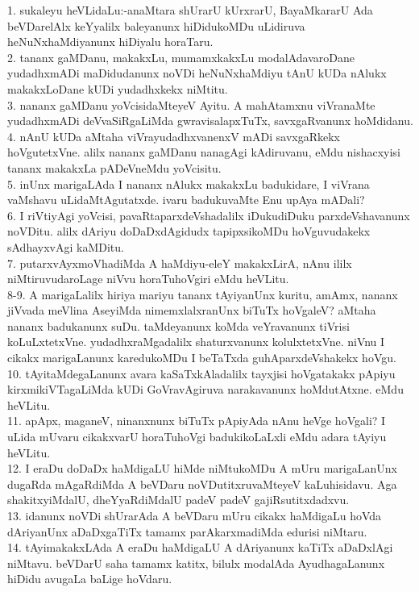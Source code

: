 \documentclass{article}
\begin{document}
1. sukaleyu heVLidaLu:-anaMtara shUrarU kUrxrarU, BayaMkararU Ada beVDarelAlx keYyalilx baleyanunx hiDidukoMDu uLidiruva heNuNxhaMdiyanunx hiDiyalu horaTaru.\\
2. tananx gaMDanu, makakxLu, mumamxkakxLu modalAdavaroDane yudadhxmADi maDidudanunx noVDi heNuNxhaMdiyu tAnU kUDa nAlukx makakxLoDane kUDi yudadhxkekx niMtitu.\\
3. nananx gaMDanu yoVcisidaMteyeV Ayitu. A mahAtamxnu viVranaMte yudadhxmADi deVvaSiRgaLiMda gwravisalapxTuTx, savxgaRvanunx hoMdidanu.\\
4. nAnU kUDa aMtaha viVrayudadhxvanenxV mADi savxgaRkekx hoVgutetxVne. alilx nananx gaMDanu nanagAgi kAdiruvanu, eMdu nishacxyisi tananx makakxLa pADeVneMdu yoVcisitu.\\
5. inUnx marigaLAda I nananx nAlukx makakxLu badukidare, I viVrana vaMshavu uLidaMtAgutatxde. ivaru badukuvaMte Enu upAya mADali?\\
6. I riVtiyAgi yoVcisi, pavaRtaparxdeVshadalilx iDukudiDuku parxdeVshavanunx noVDitu. alilx dAriyu doDaDxdAgidudx tapipxsikoMDu hoVguvudakekx sAdhayxvAgi kaMDitu.\\
7. putarxvAyxmoVhadiMda A haMdiyu-eleY makakxLirA, nAnu ililx niMtiruvudaroLage niVvu horaTuhoVgiri eMdu heVLitu.\\
8-9. A marigaLalilx hiriya mariyu tananx tAyiyanUnx kuritu, amAmx, nananx jiVvada meVlina AseyiMda nimemxlalxranUnx biTuTx hoVgaleV? aMtaha nananx badukanunx suDu. taMdeyanunx koMda veYravanunx tiVrisi koLuLxtetxVne. yudadhxraMgadalilx shaturxvanunx kolulxtetxVne. niVnu I cikakx marigaLanunx karedukoMDu I beTaTxda guhAparxdeVshakekx hoVgu.\\
10. tAyitaMdegaLanunx avara kaSaTxkAladalilx tayxjisi hoVgatakakx pApiyu kirxmikiVTagaLiMda kUDi GoVravAgiruva narakavanunx hoMdutAtxne. eMdu heVLitu.\\
11. apApx, maganeV, ninanxnunx biTuTx pApiyAda nAnu heVge hoVgali? I uLida mUvaru cikakxvarU horaTuhoVgi badukikoLaLxli eMdu adara tAyiyu heVLitu.\\
12. I eraDu doDaDx haMdigaLU hiMde niMtukoMDu A mUru marigaLanUnx dugaRda mAgaRdiMda A beVDaru noVDutitxruvaMteyeV kaLuhisidavu. Aga shakitxyiMdalU, dheYyaRdiMdalU padeV padeV gajiRsutitxdadxvu.\\
13. idanunx noVDi shUrarAda A beVDaru mUru cikakx haMdigaLu hoVda dAriyanUnx aDaDxgaTiTx tamamx parAkarxmadiMda edurisi niMtaru.\\
14. tAyimakakxLAda A eraDu haMdigaLU A dAriyanunx kaTiTx aDaDxlAgi niMtavu. beVDarU saha tamamx katitx, bilulx modalAda AyudhagaLanunx hiDidu avugaLa baLige hoVdaru.\\
\end{document}

